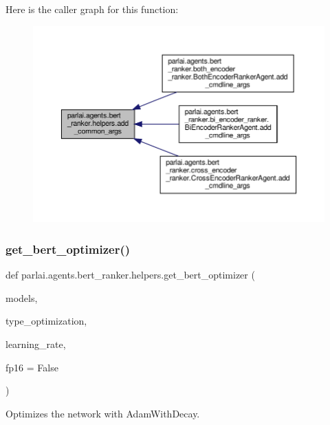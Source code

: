 Here is the caller graph for this function\+:
\nopagebreak
\begin{figure}[H]
\begin{center}
\leavevmode
\includegraphics[width=350pt]{namespaceparlai_1_1agents_1_1bert__ranker_1_1helpers_ac2e926c3aba3a62be09e2c37dffcaee2_icgraph}
\end{center}
\end{figure}
\mbox{\label{namespaceparlai_1_1agents_1_1bert__ranker_1_1helpers_a7a144c1f6c9af7925e754b9b61c0e6fb}} 
\subsubsection{\texorpdfstring{get\+\_\+bert\+\_\+optimizer()}{get\_bert\_optimizer()}}
{\footnotesize\ttfamily def parlai.\+agents.\+bert\+\_\+ranker.\+helpers.\+get\+\_\+bert\+\_\+optimizer (\begin{DoxyParamCaption}\item[{}]{models,  }\item[{}]{type\+\_\+optimization,  }\item[{}]{learning\+\_\+rate,  }\item[{}]{fp16 = {\ttfamily False} }\end{DoxyParamCaption})}

\begin{DoxyVerb}Optimizes the network with AdamWithDecay.\end{DoxyVerb}
 

